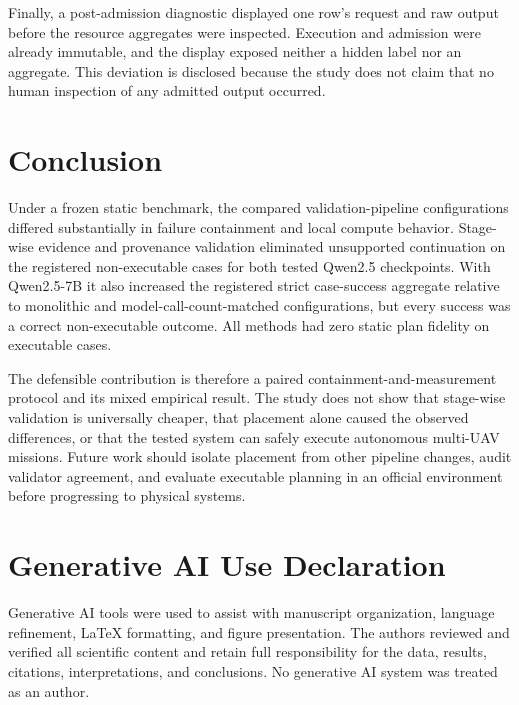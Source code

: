 \documentclass[conference]{IEEEtran}
\begin{document}
Finally, a post-admission diagnostic displayed one row's request and raw output
before the resource aggregates were inspected. Execution and admission were
already immutable, and the display exposed neither a hidden label nor an
aggregate. This deviation is disclosed because the study does not claim that
no human inspection of any admitted output occurred.

\section{Conclusion}

Under a frozen static benchmark, the compared validation-pipeline
configurations differed substantially in failure containment and local compute
behavior. Stage-wise evidence and provenance validation eliminated unsupported
continuation on the registered non-executable cases for both tested Qwen2.5
checkpoints. With Qwen2.5-7B it also increased the registered strict case-success
aggregate relative to monolithic and model-call-count-matched configurations,
but every success was a correct non-executable outcome. All methods had zero
static plan fidelity on executable cases.

The defensible contribution is therefore a paired containment-and-measurement
protocol and its mixed empirical result. The study does not show that
stage-wise validation is universally cheaper, that placement alone caused the
observed differences, or that the tested system can safely execute autonomous
multi-UAV missions. Future work should isolate placement from other pipeline
changes, audit validator agreement, and evaluate executable planning in an
official environment before progressing to physical systems.

\section*{Generative AI Use Declaration}

Generative AI tools were used to assist with manuscript organization, language
refinement, \LaTeX{} formatting, and figure presentation. The authors reviewed
and verified all scientific content and retain full responsibility for the
data, results, citations, interpretations, and conclusions. No generative AI
system was treated as an author.
\end{document}
